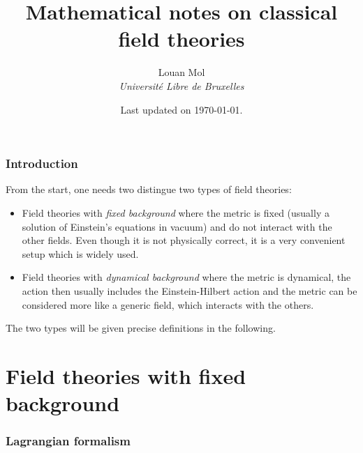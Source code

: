 \documentclass[a4paper,10pt]{article}
\title{\vspace{-2cm}\textbf{Mathematical notes on classical field theories}}
\author{Louan Mol\\ \textit{Université Libre de Bruxelles}}
\date{Last updated on \today.}
\begin{document}
\maketitle

\tableofcontents

\pagebreak

\section*{Introduction}

    From the start, one needs two distingue two types of field theories:
    \begin{itemize}
        \item Field theories with \emph{fixed background} where the metric is fixed (usually a solution of Einstein's equations in vacuum) and do not interact with the other fields. Even though it is not physically correct, it is a very convenient setup which is widely used.
        \item Field theories with \emph{dynamical background} where the metric is dynamical, the action then usually includes the Einstein-Hilbert action and the metric can be considered more like a generic field, which interacts with the others.
    \end{itemize}
    The two types will be given precise definitions in the following.

\pagebreak

\part{Field theories with fixed background}

\section{Lagrangian formalism}
\end{document}
